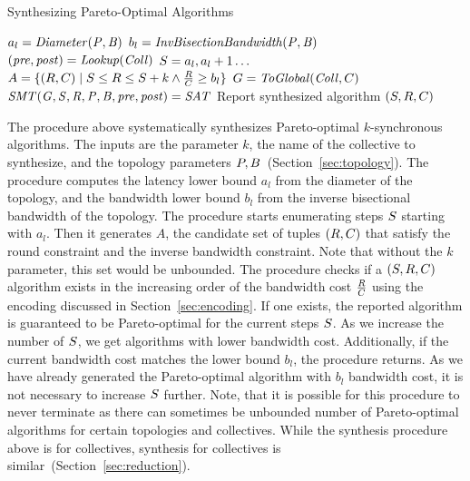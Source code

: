 \begin{algorithm}
	\caption{Synthesizing Pareto-Optimal Algorithms}
    \begin{algorithmic}[1]
        \State $a_l = \mathit{Diameter(P, B)}$ \State $b_l =
        \mathit{InvBisectionBandwidth(P, B)}$ \State $(\mathit{pre},
        \mathit{post}) = \mathit{Lookup(Coll)}$
         \For
        {$S=a_l,a_l+1\ldots$} \State $A = \{(R,C) \mid
        S \leq R \leq S+k \wedge
        \frac{R}{C} \geq b_l\}$  \State
        $G=\mathit{ToGlobal}(\mathit{Coll},C)$ \If
        {$\mathit{SMT(G, S, R, P, B, \mathit{pre},
        \mathit{post}) = SAT}$} \State Report synthesized algorithm
        $(S,R,C)$ 
         \EndIf {} \EndIf \EndFor
        \EndFor \EndProcedure
	\end{algorithmic}
\end{algorithm}

The procedure above systematically synthesizes Pareto-optimal
$k$-synchronous algorithms. The inputs are the parameter $k$, the name
of the collective to synthesize, and the topology parameters $P,
B$~(Section~\ref{sec:topology}). The procedure computes the latency
lower bound $a_l$ from the diameter of the topology, and the bandwidth
lower bound $b_l$ from the inverse bisectional bandwidth of the
topology. The procedure starts enumerating steps $S$ starting
with $a_l$. Then it generates $A$, the candidate set of tuples
$(R, C)$ that satisfy the round constraint and the inverse
bandwidth constraint. Note that without the $k$ parameter, this set
would be unbounded. The procedure checks if a
$(S,R,C)$ algorithm exists in the increasing order of
the bandwidth cost $\frac{R}{C}$ using the encoding
discussed in Section~\ref{sec:encoding}. If one exists, the reported
algorithm is guaranteed to be Pareto-optimal for the current steps
$S$. As we increase the number of $S$, we get algorithms
with lower bandwidth cost. Additionally, if the current bandwidth cost
matches the lower bound $b_l$, the procedure returns. As we have
already generated the Pareto-optimal algorithm with $b_l$ bandwidth
cost, it is not necessary to increase $S$ further. Note, that it
is possible for this procedure to never terminate as there can
sometimes be unbounded number of Pareto-optimal algorithms for certain
topologies and collectives. While the synthesis procedure above is for
\broadcasting collectives, synthesis for \reducing collectives is
similar~(Section~\ref{sec:reduction}).
